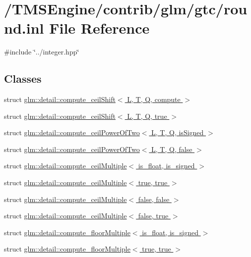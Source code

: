 \hypertarget{round_8inl}{}\section{/\+T\+M\+S\+Engine/contrib/glm/gtc/round.inl File Reference}
\label{round_8inl}
{\ttfamily \#include \char`\"{}../integer.\+hpp\char`\"{}}\newline
\subsection*{Classes}
\begin{DoxyCompactItemize}
\item 
struct \hyperlink{structglm_1_1detail_1_1compute__ceil_shift}{glm\+::detail\+::compute\+\_\+ceil\+Shift$<$ L, T, Q, compute $>$}
\item 
struct \hyperlink{structglm_1_1detail_1_1compute__ceil_shift_3_01_l_00_01_t_00_01_q_00_01true_01_4}{glm\+::detail\+::compute\+\_\+ceil\+Shift$<$ L, T, Q, true $>$}
\item 
struct \hyperlink{structglm_1_1detail_1_1compute__ceil_power_of_two}{glm\+::detail\+::compute\+\_\+ceil\+Power\+Of\+Two$<$ L, T, Q, is\+Signed $>$}
\item 
struct \hyperlink{structglm_1_1detail_1_1compute__ceil_power_of_two_3_01_l_00_01_t_00_01_q_00_01false_01_4}{glm\+::detail\+::compute\+\_\+ceil\+Power\+Of\+Two$<$ L, T, Q, false $>$}
\item 
struct \hyperlink{structglm_1_1detail_1_1compute__ceil_multiple}{glm\+::detail\+::compute\+\_\+ceil\+Multiple$<$ is\+\_\+float, is\+\_\+signed $>$}
\item 
struct \hyperlink{structglm_1_1detail_1_1compute__ceil_multiple_3_01true_00_01true_01_4}{glm\+::detail\+::compute\+\_\+ceil\+Multiple$<$ true, true $>$}
\item 
struct \hyperlink{structglm_1_1detail_1_1compute__ceil_multiple_3_01false_00_01false_01_4}{glm\+::detail\+::compute\+\_\+ceil\+Multiple$<$ false, false $>$}
\item 
struct \hyperlink{structglm_1_1detail_1_1compute__ceil_multiple_3_01false_00_01true_01_4}{glm\+::detail\+::compute\+\_\+ceil\+Multiple$<$ false, true $>$}
\item 
struct \hyperlink{structglm_1_1detail_1_1compute__floor_multiple}{glm\+::detail\+::compute\+\_\+floor\+Multiple$<$ is\+\_\+float, is\+\_\+signed $>$}
\item 
struct \hyperlink{structglm_1_1detail_1_1compute__floor_multiple_3_01true_00_01true_01_4}{glm\+::detail\+::compute\+\_\+floor\+Multiple$<$ true, true $>$}

\end{DoxyCompactItemize}
